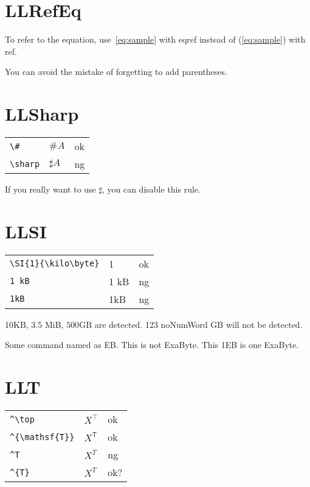 \documentclass[a4paper]{article}
\newcommand{\tA}[1]{\textcolor{cA}{#1}}
\newcommand{\tC}[1]{\textcolor{cC}{#1}}
\newcommand{\tD}[1]{\textcolor{cD}{#1}}
\begin{document}
\section{LLRefEq}

To refer to the equation, use~\eqref{eq:sample} with eqref instead of (\ref{eq:sample}) with ref.

You can avoid the mistake of forgetting to add parentheses.

\section{LLSharp}

\begin{table}[H]
	\centering
	\begin{tabular}{lll}
		\verb|\#|     & $\#A$      & \tA{ok} \\
		\verb|\sharp| & $\sharp A$ & \tD{ng}
	\end{tabular}
\end{table}

If you really want to use $\sharp$, you can disable this rule.

\section{LLSI}

\begin{table}[H]
	\centering
	\begin{tabular}{lll}
		\verb|\SI{1}{\kilo\byte}| & \SI{1}{\kilo\byte} & \tA{ok} \\
		\verb|1 kB|               & 1 kB               & \tD{ng} \\
		\verb|1kB|                & 1kB                & \tD{ng} \\
	\end{tabular}
\end{table}

\newcommand{\EB}{Some command named as EB}

10KB, $3.5$ MiB, $500 \mathrm{GB}$ are detected. 123 noNumWord GB will not be detected.

\EB. This is not ExaByte. This 1EB is one ExaByte.

\section{LLT}

\begin{table}[H]
	\centering
	\begin{tabular}{lll}
		\verb|^\top|         & $X^\top$         & \tA{ok}  \\
		\verb|^{\mathsf{T}}| & $X^{\mathsf{T}}$ & \tA{ok}  \\
		\verb|^T|            & $X^T$            & \tD{ng}  \\
		\verb|^{T}|          & $X^{T}$          & \tC{ok?} \\
	\end{tabular}
\end{table}
\end{document}
